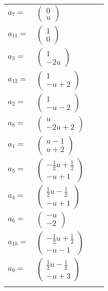 \documentclass[1p]{elsarticle_modified}
\theoremstyle{definition}
\begin{document}
\begin{tabular}{m{7pt} m{180pt} m{7pt} m{180pt} }
\flushright $a_{7}=$&$\begin{pmatrix}0\\u\end{pmatrix}$ \\
\flushright $a_{11}=$&$\begin{pmatrix}1\\0\end{pmatrix}$ \\
\flushright $a_{3}=$&$\begin{pmatrix}1\\-2 u\end{pmatrix}$ \\
\flushright $a_{12}=$&$\begin{pmatrix}1\\- u+2\end{pmatrix}$ \\
\flushright $a_{2}=$&$\begin{pmatrix}1\\- u-2\end{pmatrix}$ \\
\flushright $a_{8}=$&$\begin{pmatrix}u\\-2 u+2\end{pmatrix}$ \\
\flushright $a_{1}=$&$\begin{pmatrix}u-1\\u+2\end{pmatrix}$ \\
\flushright $a_{5}=$&$\begin{pmatrix}-\frac{1}{2} u+\frac{1}{2}\\- u+1\end{pmatrix}$ \\
\flushright $a_{4}=$&$\begin{pmatrix}\frac{1}{2} u-\frac{1}{2}\\- u+1\end{pmatrix}$ \\
\flushright $a_{6}=$&$\begin{pmatrix}- u\\-2\end{pmatrix}$ \\
\flushright $a_{10}=$&$\begin{pmatrix}-\frac{1}{2} u+\frac{1}{2}\\- u-1\end{pmatrix}$ \\
\flushright $a_{9}=$&$\begin{pmatrix}\frac{1}{2} u-\frac{1}{2}\\- u+3\end{pmatrix}$\\&\end{tabular}
\end{document}
